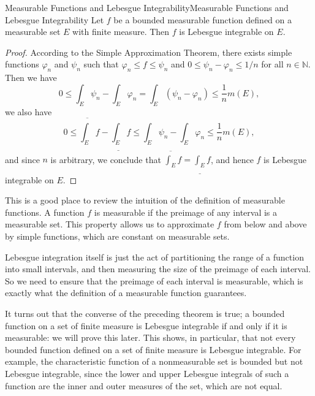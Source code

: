 \documentclass[../main.tex]{subfiles}
\begin{document}
\begin{theorem}{Measurable Functions and Lebesgue Integrability}{Measurable Functions and Lebesgue Integrability}
	Let $f$ be a bounded measurable function defined on a measurable set $E$ with finite measure. Then $f$ is Lebesgue integrable on $E$.
\end{theorem}
\begin{proof}
	According to the Simple Approximation Theorem, there exists simple functions $\varphi_n$ and $\psi_n$ such that $\varphi_n \leq f \leq \psi_n$ and $0 \leq \psi_n - \varphi_n \leq 1/n$ for all $n \in \mathbb{N}$. Then we have
	\begin{equation*}
		0 \leq \int_E \psi_n - \int_E \varphi_n = \int_E (\psi_n - \varphi_n) \leq \frac{1}{n} m(E),
	\end{equation*}
	we also have
	\begin{equation*}
		0 \leq \overline{\int_E} f - \underline{\int_E} f \leq \int_E \psi_n - \int_E \varphi_n \leq \frac{1}{n} m(E),
	\end{equation*}
	and since $n$ is arbitrary, we conclude that $\overline{\int_E} f = \underline{\int_E} f$, and hence $f$ is Lebesgue integrable on $E$.
\end{proof}

\begin{remark}
	This is a good place to review the intuition of the definition of measurable functions. A function $f$ is measurable if the preimage of any interval is a measurable set. This property allows us to approximate $f$ from below and above by simple functions, which are constant on measurable sets.

	Lebesgue integration itself is just the act of partitioning the range of a function into small intervals, and then measuring the size of the preimage of each interval. So we need to ensure that the preimage of each interval is measurable, which is exactly what the definition of a measurable function guarantees.
\end{remark}

It turns out that the converse of the preceding theorem is true; a bounded function on a set of finite measure is Lebesgue integrable if and only if it is measurable: we will prove this later. This shows, in particular, that not every bounded function defined on a set of finite measure is Lebesgue integrable. For example, the characteristic function of a nonmeasurable set is bounded but not Lebesgue integrable, since the lower and upper Lebesgue integrals of such a function are the inner and outer measures of the set, which are not equal.
\end{document}

